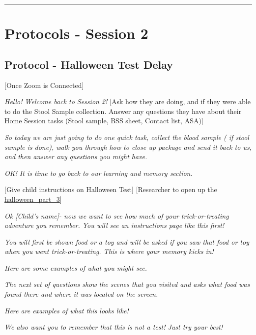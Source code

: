 \documentclass[]{book}
\begin{document}
\begin{center}\rule{0.5\linewidth}{0.5pt}\end{center}

\hypertarget{protocols---session-2-2}{%
\section{Protocols - Session 2}\label{protocols---session-2-2}}

\hypertarget{protocol---halloween-test-delay-2}{%
\subsection{Protocol - Halloween Test Delay}\label{protocol---halloween-test-delay-2}}

{[}Once Zoom is Connected{]}

\emph{Hello! Welcome back to Session 2!} {[}Ask how they are doing, and if they were able to do the Stool Sample collection. Answer any questions they have about their Home Session tasks (Stool sample, BSS sheet, Contact list, ASA){]}

\emph{So today we are just going to do one quick task, collect the blood sample ( if stool sample is done), walk you through how to close up package and send it back to us, and then answer any questions you might have.}

\emph{OK! It is time to go back to our learning and memory section.}

{[}Give child instructions on Halloween Test{]} {[}Researcher to open up the \href{https://ucla.app.box.com/file/737558206552}{halloween\_part\_3}{]}

\emph{Ok {[}Child's name{]}- now we want to see how much of your trick-or-treating adventure you remember. You will see an instructions page like this first!}

\emph{You will first be shown food or a toy and will be asked if you saw that food or toy when you went trick-or-treating. This is where your memory kicks in!}

\emph{Here are some examples of what you might see.}

\emph{The next set of questions show the scenes that you visited and asks what food was found there and where it was located on the screen.}

\emph{Here are examples of what this looks like!}

\emph{We also want you to remember that this is not a test! Just try your best!}
\end{document}
